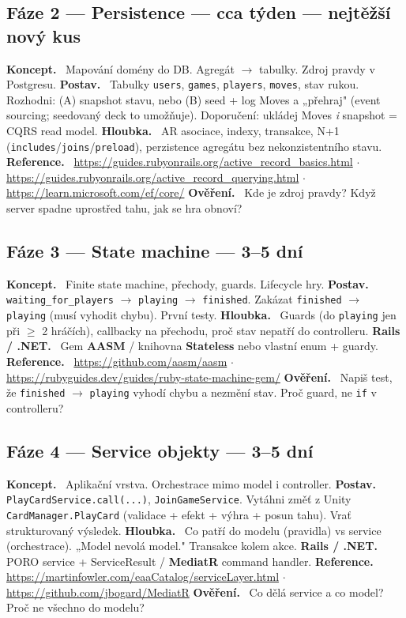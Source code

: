 \documentclass[11pt]{article}
\newcommand{\phase}[2]{\subsection{#1 \textnormal{\textcolor{soft}{\small— #2}}}}
\newcommand{\field}[1]{\textbf{#1.}\ }
\begin{document}
\phase{Fáze 2 — Persistence}{cca týden — nejtěžší nový kus}
\field{Koncept} Mapování domény do DB. Agregát $\rightarrow$ tabulky. Zdroj pravdy v Postgresu.
\field{Postav} Tabulky \texttt{users}, \texttt{games}, \texttt{players}, \texttt{moves}, stav rukou. Rozhodni: (A) snapshot stavu, nebo (B) seed + log Moves a „přehraj" (event sourcing; seedovaný deck to umožňuje). Doporučení: ukládej Moves \emph{i} snapshot = CQRS read model.
\field{Hloubka} AR asociace, indexy, transakce, N+1 (\texttt{includes}/\texttt{joins}/\texttt{preload}), perzistence agregátu bez nekonzistentního stavu.
\field{Reference} \url{https://guides.rubyonrails.org/active_record_basics.html} $\cdot$ \url{https://guides.rubyonrails.org/active_record_querying.html} $\cdot$ \url{https://learn.microsoft.com/ef/core/}
\field{Ověření} Kde je zdroj pravdy? Když server spadne uprostřed tahu, jak se hra obnoví?

\phase{Fáze 3 — State machine}{3–5 dní}
\field{Koncept} Finite state machine, přechody, guards. Lifecycle hry.
\field{Postav} \texttt{waiting\_for\_players} $\rightarrow$ \texttt{playing} $\rightarrow$ \texttt{finished}. Zakázat \texttt{finished} $\rightarrow$ \texttt{playing} (musí vyhodit chybu). První testy.
\field{Hloubka} Guards (do \texttt{playing} jen při $\geq$ 2 hráčích), callbacky na přechodu, proč stav nepatří do controlleru.
\field{Rails / .NET} Gem \textbf{AASM} / knihovna \textbf{Stateless} nebo vlastní enum + guardy.
\field{Reference} \url{https://github.com/aasm/aasm} $\cdot$ \url{https://rubyguides.dev/guides/ruby-state-machine-gem/}
\field{Ověření} Napiš test, že \texttt{finished} $\rightarrow$ \texttt{playing} vyhodí chybu a nezmění stav. Proč guard, ne \texttt{if} v controlleru?

\phase{Fáze 4 — Service objekty}{3–5 dní}
\field{Koncept} Aplikační vrstva. Orchestrace mimo model i controller.
\field{Postav} \texttt{PlayCardService.call(...)}, \texttt{JoinGameService}. Vytáhni změť z Unity \texttt{CardManager.PlayCard} (validace + efekt + výhra + posun tahu). Vrať strukturovaný výsledek.
\field{Hloubka} Co patří do modelu (pravidla) vs service (orchestrace). „Model nevolá model." Transakce kolem akce.
\field{Rails / .NET} PORO service + ServiceResult / \textbf{MediatR} command handler.
\field{Reference} \url{https://martinfowler.com/eaaCatalog/serviceLayer.html} $\cdot$ \url{https://github.com/jbogard/MediatR}
\field{Ověření} Co dělá service a co model? Proč ne všechno do modelu?
\end{document}
